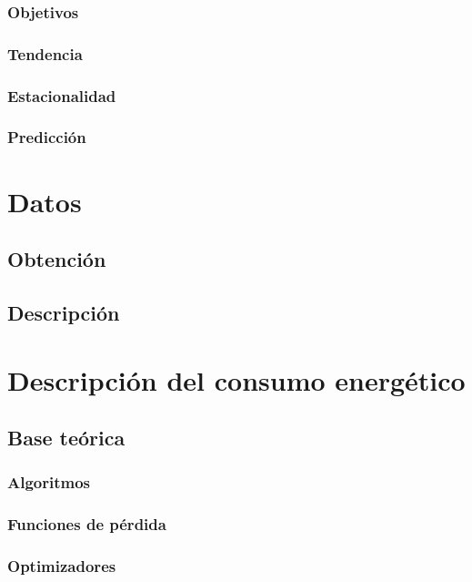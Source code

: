 \documentclass[a4paper,12pt]{article}
\begin{document}
\subsubsection{Objetivos}

\subsubsection{Tendencia}

\subsubsection{Estacionalidad}

\subsubsection{Predicción}

\section{Datos}

\subsection{Obtención}

\subsection{Descripción}

\section{Descripción del consumo energético}

\subsection{Base teórica}

\subsubsection{Algoritmos}

\subsubsection{Funciones de pérdida}

\subsubsection{Optimizadores}
\end{document}
